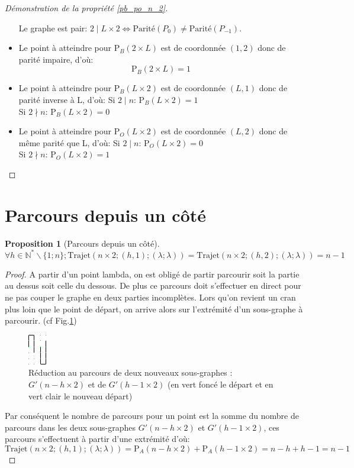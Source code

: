 \documentclass[twoside, a4paper, 12pt]{report}
\newtheorem{property}[theorem]{Proposition}
\newcommand{\parite}[1]{\ensuremath{\text{Parité}(#1)}}
\newcommand{\trajet}[6]{\ensuremath{\text{Trajet}\left(#1 \times #2; (#3, #4); (#5; #6)\right)}}
\newcommand{\pa}[2]{\ensuremath{\text{P}_A\left(#1 \times #2\right)}}
\newcommand{\pb}[2]{\ensuremath{\text{P}_B\left(#1 \times #2\right)}}
\newcommand{\po}[2]{\ensuremath{\text{P}_O\left(#1 \times #2\right)}}
\begin{document}
\begin{proof}[Démonstration de la propriété \ref{pb_po_n_2}]
\begin{itemize}

Le graphe est pair: $2 \mid L \times 2 \Leftrightarrow \parite{P_0} \not= \parite{P_{-1}}$.

\item Le point à atteindre pour \pb{2}{L} est de coordonnée $(1, 2)$ donc de parité impaire, d'où:
\[\pb{2}{L} = 1\]

\item Le point à atteindre pour \pb{L}{2} est de coordonnée $(L, 1)$ donc de parité inverse à L, d'où:
Si $2 \mid n$:
$\pb{L}{2} = 1$ \\
Si $2 \nmid n$:
$\pb{L}{2} = 0$

\item Le point à atteindre pour \po{L}{2} est de coordonnée $(L, 2)$ donc de même parité que L, d'où:
Si $2 \mid n$:
$\po{L}{2} = 0$ \\
Si $2 \nmid n$:
$\po{L}{2} = 1$
\end{itemize}
\end{proof}

\section{Parcours depuis un côté}

\begin{property}[Parcours depuis un côté]
\[\forall h \in \mathbb{N}^* \backslash \{1; n\};      \trajet{n}{2}{h}{1}{\lambda}{\lambda} = \trajet{n}{2}{h}{2}{\lambda}{\lambda} = n - 1\]
\end{property}

\begin{proof}
A partir d'un point lambda, on est obligé de partir parcourir soit la partie au dessus soit celle du dessous. De plus ce parcours doit s'effectuer en direct pour ne pas couper le graphe en deux parties incomplètes. Lors qu'on revient un cran plus loin que le point de départ, on arrive alors sur l'extrémité d'un sous-graphe à parcourir.  (cf Fig.\ref{reduction_alternative})
\begin{figure}[h!]
\centering\includegraphics[angle=90, scale=5]{reduction_alternative.png}
\caption[Réduction au parcours de deux nouveaux sous-graphes : $G'(n-h\times 2)$ et de $G'(h-1\times 2)$]{Réduction au parcours de deux nouveaux sous-graphes : $G'(n-h\times 2)$ et de $G'(h-1\times 2)$ (en vert foncé le départ et en vert clair le nouveau départ)}
\label{reduction_alternative}
\end{figure}

Par conséquent le nombre de parcours pour un point est la somme du nombre de parcours dans les deux sous-graphes $G'(n-h\times 2)$ et $G'(h-1\times 2)$, ces parcours s'effectuent à partir d'une extrémité d'où:
\[\trajet{n}{2}{h}{1}{\lambda}{\lambda}  = \pa{n - h}{2} + \pa{h-1}{2} = n - h + h - 1 = n - 1\]
\end{proof}
\end{document}
